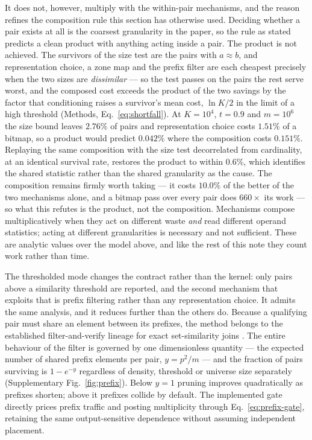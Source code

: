 It does not, however, multiply with the within-pair mechanisms, and the reason refines the composition
rule this section has otherwise used. Deciding whether a pair exists at all is the coarsest
granularity in the paper, so the rule as stated predicts a clean product with anything acting inside a
pair. The product is not achieved. The survivors of the size test are the pairs with $a \approx b$, and
representation choice, a zone map and the prefix filter are each cheapest precisely when the two sizes
are \emph{dissimilar} --- so the test passes on the pairs the rest serve worst, and the composed cost
exceeds the product of the two savings by the factor that conditioning raises a survivor's mean cost,
$\ln K / 2$ in the limit of a high threshold (Methods, Eq.~\eqref{eq:shortfall}). At $K = 10^{4}$, $t =
0.9$ and $m = 10^{6}$ the size bound leaves $2.76\%$ of pairs and representation choice costs $1.51\%$
of a bitmap, so a product would predict $0.042\%$ where the composition costs $0.151\%$. Replaying the
same composition with the size test decorrelated from cardinality, at an identical survival rate,
restores the product to within $0.6\%$, which identifies the shared statistic rather than the shared
granularity as the cause. The composition remains firmly worth taking --- it costs $10.0\%$ of the
better of the two mechanisms alone, and a bitmap pass over every pair does $660\times$ its work --- so
what this refutes is the product, not the composition. Mechanisms compose multiplicatively when
they act on different waste \emph{and} read different operand statistics; acting at different
granularities is necessary and not sufficient. These are analytic values over the model above, and
like the rest of this note they count work rather than time.

The thresholded mode changes the contract rather than the kernel: only pairs above a similarity
threshold are reported, and the second mechanism that exploits that is prefix filtering rather than any
representation choice. It admits the same analysis, and it reduces further than the others do. Because
a qualifying pair must share an element between its prefixes, the method belongs to the established
filter-and-verify lineage for exact set-similarity joins
\cite{sarawagi2004setjoins,arasu2006exact,bayardo2007allpairs,xiao2011ppjoin,mann2016empirical}.
The entire behaviour of the filter is
governed by one dimensionless quantity --- the expected number of shared prefix elements per pair, $y =
p^{2}/m$ --- and the fraction of pairs surviving is $1 - e^{-y}$ regardless of density, threshold or
universe size separately (Supplementary Fig.~\ref{fig:prefix}). Below $y = 1$ pruning improves
quadratically as prefixes shorten; above it prefixes collide by default. The implemented gate
directly prices prefix traffic and posting multiplicity through Eq.~\eqref{eq:prefix-gate}, retaining
the same output-sensitive dependence without assuming independent placement.

